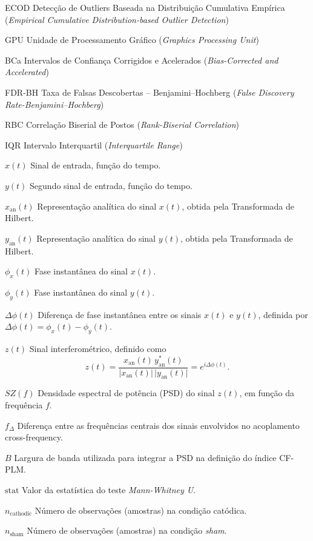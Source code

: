 \documentclass[
  12pt,
  openany,
  twoside,
  a4paper,
  english,
  brazil
]{abntex2}
\begin{document}
\begin{siglas}
  \item[ECOD] Detecção de Outliers Baseada na Distribuição Cumulativa Empírica (\textit{Empirical Cumulative Distribution-based Outlier Detection})
  \item[GPU] Unidade de Processamento Gráfico (\textit{Graphics Processing Unit})
  \item[BCa] Intervalos de Confiança Corrigidos e Acelerados (\textit{Bias-Corrected and Accelerated})
  \item[FDR-BH] Taxa de Falsas Descobertas – Benjamini–Hochberg (\textit{False Discovery Rate-Benjamini–Hochberg})
  \item[RBC] Correlação Biserial de Postos (\textit{Rank-Biserial Correlation})
  \item[IQR] Intervalo Interquartil (\textit{Interquartile Range})
\end{siglas}


\begin{simbolos}
  \item[$x(t)$] Sinal de entrada, função do tempo.
  \item[$y(t)$] Segundo sinal de entrada, função do tempo.
  \item[$x_{\mathrm{an}}(t)$] Representação analítica do sinal \(x(t)\), obtida pela Transformada de Hilbert.
  \item[$y_{\mathrm{an}}(t)$] Representação analítica do sinal \(y(t)\), obtida pela Transformada de Hilbert.
  \item[$\phi_x(t)$] Fase instantânea do sinal \(x(t)\).
  \item[$\phi_y(t)$] Fase instantânea do sinal \(y(t)\).
  \item[$\Delta \phi(t)$] Diferença de fase instantânea entre os sinais \(x(t)\) e \(y(t)\), definida por \(\Delta \phi(t) = \phi_x(t)-\phi_y(t)\).
  \item[$z(t)$] Sinal interferométrico, definido como 
  \[
  z(t)=\frac{x_{\mathrm{an}}(t)\, y_{\mathrm{an}}^*(t)}{\lvert x_{\mathrm{an}}(t)\rvert\, \lvert y_{\mathrm{an}}(t)\rvert} = e^{i\Delta \phi(t)}.
  \]
  \item[$SZ(f)$] Densidade espectral de potência (PSD) do sinal \(z(t)\), em função da frequência \(f\).
  \item[$f_\Delta$] Diferença entre as frequências centrais dos sinais envolvidos no acoplamento cross-frequency.
  \item[$B$] Largura de banda utilizada para integrar a PSD na definição do índice CF-PLM.
  \item[$\text{stat}$] Valor da estatística do teste \textit{Mann-Whitney U}.
  \item[$n_{\text{cathodic}}$] Número de observações (amostras) na condição catódica.
  \item[$n_{\text{sham}}$] Número de observações (amostras) na condição \textit{sham}.
\end{simbolos}
\end{document}
